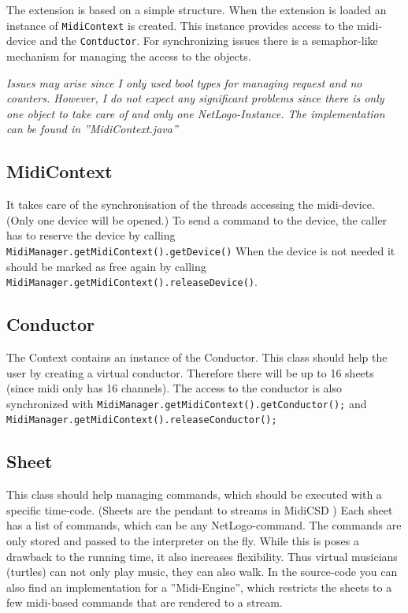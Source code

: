 \documentclass[10pt,a4paper]{article}
\begin{document}
The extension is based on a simple structure. When the extension is loaded an instance
of \lstinline|MidiContext| is created. This instance provides access to the midi-device
and the \lstinline|Contductor|. For synchronizing issues there is a semaphor-like mechanism
for managing the access to the objects. 

\textit{Issues may arise since I only used bool types for managing request and no
counters. However, I do not expect any significant problems since there is only one object to
take care of and only one NetLogo-Instance. The implementation can be found in ''MidiContext.java''}

\subsection{MidiContext}
It takes care of the synchronisation of the threads accessing the midi-device.
(Only one device will be opened.) To send a command to the device, the caller
has to reserve the device by calling \lstinline|MidiManager.getMidiContext().getDevice()|
When the device is not needed it should be marked as free again by calling 
\lstinline|MidiManager.getMidiContext().releaseDevice()|.  

\subsection{Conductor}
The Context contains an instance of the Conductor. This class should help
the user by creating a virtual conductor. Therefore there will be up to 16 sheets (since midi only has
16 channels). The access to the conductor is also synchronized with 
\lstinline|MidiManager.getMidiContext().getConductor();|
and \lstinline|MidiManager.getMidiContext().releaseConductor();|

\subsection{Sheet}
This class should help managing commands, which should be executed with a specific time-code.
(Sheets are the pendant to streams in MidiCSD \cite{MidiCSD})
Each sheet has a list of commands, which can be any NetLogo-command. The commands are only
stored and passed to the interpreter on the fly. While this is poses a drawback to the running time, it also
increases flexibility. Thus virtual musicians (turtles) can not only play music, they can also
walk. 
In the source-code you can also find an implementation for a ''Midi-Engine'', which restricts the
sheets to a few midi-based commands that are rendered to a stream. 
\end{document}
